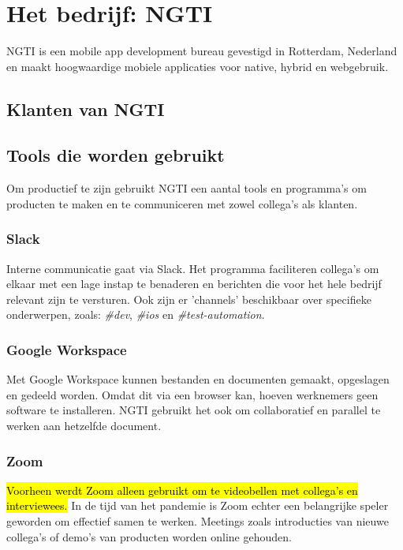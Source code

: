 
\section{Het bedrijf: NGTI}\label{sec:het-bedrijf-ngti}
NGTI is een mobile app development bureau gevestigd in Rotterdam, Nederland en maakt hoogwaardige mobiele applicaties voor native, hybrid en webgebruik.

\subsection{Klanten van NGTI}\label{subsec:klanten-van-ngti}


\subsection{Tools die worden gebruikt}\label{subsec:tools-die-gebruikt-worden}
Om productief te zijn gebruikt NGTI een aantal tools en programma's om producten te maken en te communiceren met zowel collega's als klanten.

\subsubsection{Slack}\label{subsubsec:slack}
Interne communicatie gaat via Slack. Het programma faciliteren collega's om elkaar met een lage instap te benaderen en berichten die voor het hele bedrijf relevant zijn te versturen. Ook zijn er 'channels' beschikbaar over specifieke onderwerpen, zoals: \textit{\#dev}, \textit{\#ios} en \textit{\#test-automation}.

\subsubsection{Google Workspace}\label{subsubsec:google-workspace}
Met Google Workspace kunnen bestanden en documenten gemaakt, opgeslagen en gedeeld worden. Omdat dit via een browser kan, hoeven werknemers geen software te installeren. NGTI gebruikt het ook om collaboratief en parallel te werken aan hetzelfde document.

\subsubsection{Zoom}\label{subsubsec:zoom}
\hl{Voorheen werdt Zoom alleen gebruikt om te videobellen met collega's en interviewees.} In de tijd van het pandemie is Zoom echter een belangrijke speler geworden om effectief samen te werken. Meetings zoals introducties van nieuwe collega's of demo's van producten worden online gehouden.


